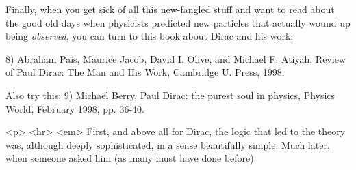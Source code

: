 Finally, when you get sick of all this new-fangled stuff and want 
to read about the good old days when physicists predicted new
particles that actually wound up being \emph{observed}, you can turn to 
this book about Dirac and his work:

8) Abraham Pais, Maurice Jacob, David I. Olive, and Michael F. Atiyah, 
Review of Paul Dirac: The Man and His Work, Cambridge U. Press, 1998.

Also try this:
9) Michael Berry, Paul Dirac: the purest soul in physics, Physics World,
February 1998, pp. 36-40.

<p> <hr>
<em> First, and above all for Dirac, the logic that led to the theory was,
although deeply sophisticated, in a sense beautifully simple.
Much later, when someone asked him (as many must have done before)


